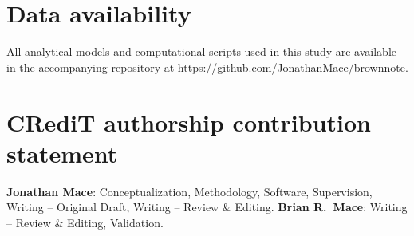 \documentclass[review]{elsarticle}
\begin{document}
\graphicspath{{../figures/}}
















\section*{Data availability}
All analytical models and computational scripts used in this study are
available in the accompanying repository at
\url{https://github.com/JonathanMace/brownnote}.

\section*{CRediT authorship contribution statement}
\textbf{Jonathan Mace}: Conceptualization, Methodology, Software, Supervision,
Writing -- Original Draft, Writing -- Review \& Editing.
\textbf{Brian R.\ Mace}: Writing -- Review \& Editing, Validation.
\end{document}
